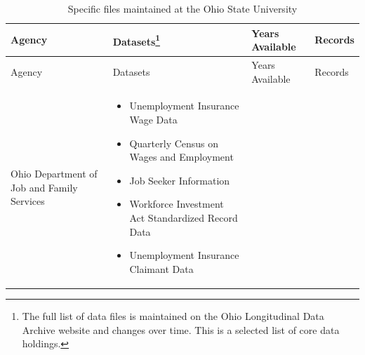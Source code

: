\documentclass[
]{WileySix}
\providecommand{\tightlist}{%
  \setlength{\itemsep}{0pt}\setlength{\parskip}{0pt}}
\begin{document}
\begin{longtable}[]{@{}llll@{}}
\caption{\label{tab:oldatable1} Specific files maintained at the Ohio State University}\tabularnewline
\toprule
\begin{minipage}[b]{0.19\columnwidth}\raggedright
Agency\strut
\end{minipage} & \begin{minipage}[b]{0.34\columnwidth}\raggedright
Datasets\footnote{The full list of
  data files is maintained
  on the Ohio Longitudinal
  Data Archive website and
  changes over time. This is
  a selected list of core
  data holdings.}\strut
\end{minipage} & \begin{minipage}[b]{0.18\columnwidth}\raggedright
Years
Available\strut
\end{minipage} & \begin{minipage}[b]{0.18\columnwidth}\raggedright
Records\strut
\end{minipage}\tabularnewline
\midrule
\endfirsthead
\toprule
\begin{minipage}[b]{0.19\columnwidth}\raggedright
Agency\strut
\end{minipage} & \begin{minipage}[b]{0.34\columnwidth}\raggedright
Datasets{}\strut
\end{minipage} & \begin{minipage}[b]{0.18\columnwidth}\raggedright
Years
Available\strut
\end{minipage} & \begin{minipage}[b]{0.18\columnwidth}\raggedright
Records\strut
\end{minipage}\tabularnewline
\midrule
\endhead
\begin{minipage}[t]{0.19\columnwidth}\raggedright
Ohio
Department
of Job and
Family
Services\strut
\end{minipage} & \begin{minipage}[t]{0.34\columnwidth}\raggedright
\begin{itemize}
\tightlist
\item
  Unemployment Insurance
  Wage Data
\item
  Quarterly Census on
  Wages and Employment
\item
  Job Seeker Information
\item
  Workforce Investment Act
  Standardized Record Data
\item
  Unemployment Insurance
  Claimant Data
\end{itemize}\strut
\end{minipage} & \begin{minipage}[t]{0.18\columnwidth}\raggedright

\end{minipage}
\end{longtable}
\end{document}
